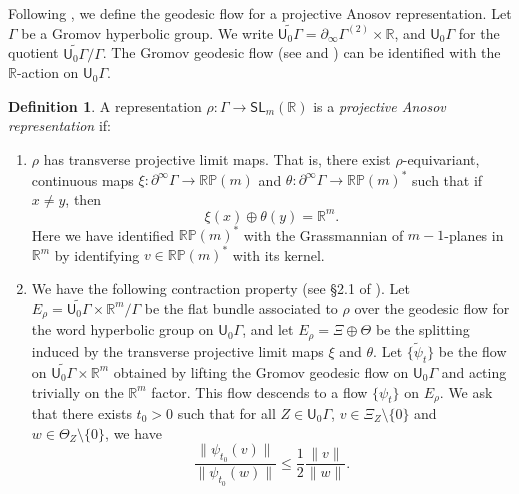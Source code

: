 \documentclass[11pt]{article}
\theoremstyle{definition}
\newtheorem{defn}[thm]{Definition}
\numberwithin{equation}{section}
\begin{document}
Following \cite{bcls}, we define the geodesic flow for a projective Anosov representation. Let $\Gamma$ be a Gromov hyperbolic group. We write $\widetilde{\mathsf{U}_0\Gamma} = \partial_\infty \Gamma^{(2)} \times \mathbb R$, and $\mathsf{U}_0\Gamma$ for the quotient $\widetilde{\mathsf{U}_0\Gamma}/\Gamma$. The Gromov geodesic flow (see \cite{champetier} and \cite{mineyev}) can be identified with the $\mathbb R$-action on $\mathsf{U}_0\Gamma$.
\begin{defn}
A representation $\rho:\Gamma\to\mathsf{SL}_m(\mathbb{R})$ is a \emph{projective Anosov representation} if:
\begin{enumerate}
\item $\rho$ has transverse projective limit maps. That is, there exist $\rho$-equivariant, continuous maps $\xi:\partial^\infty\Gamma \to \mathbb{RP}(m)$ and $\theta:\partial^\infty\Gamma \to \mathbb{RP}(m)^*$ such that if $x\neq y$, then
\[ \xi(x) \oplus \theta(y) = \mathbb{R}^m.\]
Here we have identified $\mathbb{RP}(m)^*$ with the Grassmannian of $m-1$-planes in $\mathbb{R}^m$ by identifying $v\in\mathbb{RP}(m)^*$ with its kernel.

\item We have the following contraction property (see \S2.1 of \cite{bcls}). Let $E_\rho = \widetilde{\mathsf{U}_0\Gamma} \times \mathbb R^{m}/ \Gamma$ be the flat bundle associated to $\rho$ over the geodesic flow for the word hyperbolic group on $\mathsf{U}_0\Gamma$, and let $E_\rho = \Xi \oplus \Theta$ be the splitting induced by the transverse projective limit maps $\xi$ and $\theta$. Let $\{\tilde \psi_t\}$ be the flow on $\widetilde{\mathsf{U}_0\Gamma} \times \mathbb R^{m}$ obtained by lifting the Gromov geodesic flow on $\mathsf{U}_0\Gamma$ and acting trivially on the $\mathbb R^m$ factor. This flow descends to a flow $\{\psi_t\}$ on $E_\rho$. We ask that there exists $t_0>0$ such that for all $Z\in \mathsf{U}_0\Gamma$, $v \in \Xi_Z\setminus\{0\}$ and $w \in \Theta_Z \setminus \{ 0\}$, we have
\[ \frac{\| \psi_{t_0} (v) \|}{\| \psi_{t_0} (w) \|} \leq \frac{1}{2} \frac{ \| v \|}{\| w \|}. \] 
\end{enumerate}
\end{defn}
\end{document}
